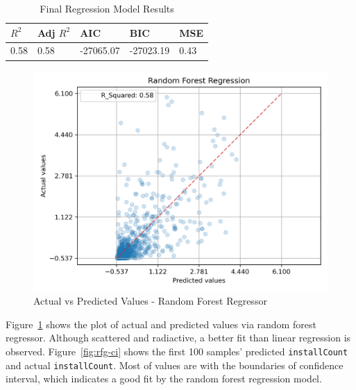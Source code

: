 \begin{table}[ht]
\centering
\begin{tabular}{|l|l|l|l|l|}
\hline
$R^2$ & Adj $R^2$ & AIC       & BIC       & MSE  \\ \hline
0.58  & 0.58   & -27065.07 & -27023.19 & 0.43 \\ \hline
\end{tabular}
\caption{Final Regression Model Results}
\label{tab:rfg-results}
\end{table}

\begin{figure}
    \centering
    \includegraphics[width=1\linewidth]{docs//assets/regressor_prediction_error.png}
    \caption{Actual vs Predicted Values - Random Forest Regressor}
    \label{fig:rfg-scatter}
\end{figure}

Figure~\ref{fig:rfg-scatter} shows the plot of actual and predicted values via random forest regressor. Although scattered and radiactive, a better fit than linear regression is observed. Figure~\ref{fig:rfg-ci} shows the first 100 samples' predicted \texttt{installCount} and actual \texttt{installCount}. Most of values are with the boundaries of confidence interval, which indicates a good fit by the random forest regression model.


